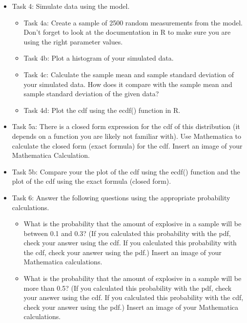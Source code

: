 \documentclass{article}
\theoremstyle{plain}
\theoremstyle{box}
\begin{document}
\begin{itemize}
\begin{itemize}
		\begin{itemize}
		\item Task 3a: Write down the system of equations you need to solve using the sample mean, sample standard deviation, and the mean and standard deviation of the distribution as functions of the parameters.
		\item Task 3b: Solve the system of equations both numerically and analytically. Be sure to include the work for your analytic solution (you can insert a picture).
		\end{itemize}
	\item Task 4: Simulate data using the model.
		\begin{itemize}
		\item Task 4a: Create a sample of 2500 random measurements from the model. Don't forget to look at the documentation in R to make sure you are using the right parameter values.
		\item Task 4b: Plot a histogram of your simulated data.
		\item Task 4c: Calculate the sample mean and sample standard deviation of your simulated data. How does it compare with the sample mean and sample standard deviation of the given data?
		\item Task 4d: Plot the cdf using the ecdf() function in R.
		\end{itemize}
	\item Task 5a: There is a closed form expression for the cdf of this distribution (it depends on a function you are likely not familiar with). Use Mathematica to calculate the closed form (exact formula) for the cdf. Insert an image of your Mathematica Calculation.
	\item Task 5b: Compare your the plot of the cdf using the ecdf() function and the plot of the cdf using the exact formula (closed form).
	\item Task 6: Answer the following questions using the appropriate probability calculations.
		\begin{itemize}
		\item What is the probability that the amount of explosive in a sample will be between 0.1 and 0.3? (If you calculated this probability with the pdf, check your answer using the cdf. If you calculated this probability with the cdf, check your answer using the pdf.) Insert an image of your Mathematica calculations.
		\item What is the probability that the amount of explosive in a sample will be more than 0.5? (If you calculated this probability with the pdf, check your answer using the cdf. If you calculated this probability with the cdf, check your answer using the pdf.) Insert an image of your Mathematica calculations.

\end{itemize}
\end{itemize}
\end{itemize}
\end{document}
